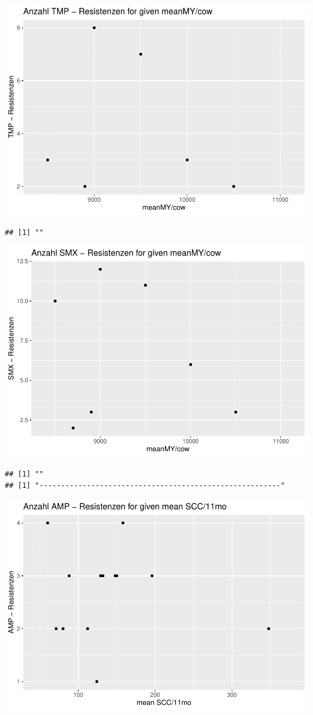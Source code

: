 \documentclass[
]{article}
\begin{document}
\includegraphics{NResistenzen_files/figure-latex/numerical_variables-9.pdf}

\begin{verbatim}
## [1] ""
\end{verbatim}

\includegraphics{NResistenzen_files/figure-latex/numerical_variables-10.pdf}

\begin{verbatim}
## [1] ""
## [1] "--------------------------------------------------------"
\end{verbatim}

\includegraphics{NResistenzen_files/figure-latex/numerical_variables-11.pdf}
\end{document}
